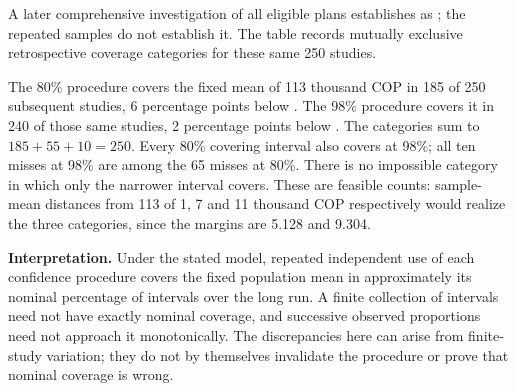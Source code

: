 \begin{probleminfoexcerpt}
A later comprehensive investigation of all eligible plans establishes    as   ; the repeated samples do not establish it. The table records mutually exclusive retrospective coverage categories for these same 250 studies.
\end{probleminfoexcerpt}




The 80\% procedure covers the fixed mean of 113 thousand COP in 185 of 250 subsequent studies, 6 percentage points below . The 98\% procedure covers it in 240 of those same studies, 2 percentage points below . The categories sum to $185+55+10=250$. Every 80\% covering interval also covers at 98\%; all ten misses at 98\% are among the 65 misses at 80\%. There is no impossible category in which only the narrower interval covers. These are feasible counts: sample-mean distances from 113 of 1, 7 and 11 thousand COP respectively would realize the three categories, since the margins are 5.128 and 9.304.

\textbf{Interpretation.} Under the stated model, repeated independent use of each confidence procedure covers the fixed population mean in approximately its nominal percentage of intervals over the long run. A finite collection of intervals need not have exactly nominal coverage, and successive observed proportions need not approach it monotonically. The discrepancies here can arise from finite-study variation; they do not by themselves invalidate the procedure or prove that nominal coverage is wrong.

